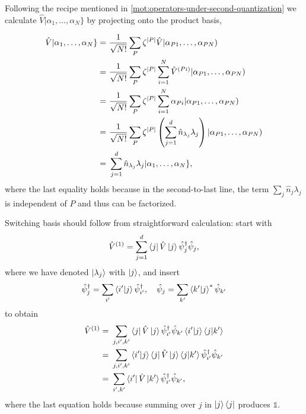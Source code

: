 \documentclass{article}
\theoremstyle{definition}
\numberwithin{equation}{section}
\begin{document}
Following the recipe mentioned 
in \cref{mot:operators-under-second-quantization}
we calculate $\hat{V}|\alpha_1, \ldots ,\alpha_{N}\}$ 
by projecting onto the product basis,

\begin{align*}
    \hat{V}|\alpha_1, \ldots ,\alpha_{N}\}
    =&\ 
    \frac{1}{\sqrt{N!}}
    \sum_{P}\zeta^{\abs{P}}
    \hat{V} |\alpha_{P1}, \ldots ,\alpha_{PN}) \\
    =&\ 
    \frac{1}{\sqrt{N!}}
    \sum_{P}\zeta^{\abs{P}}
    \sum_{i =1} ^{N}
    \hat{V}^{(Pi)}
    |\alpha_{P1}, \ldots ,\alpha_{PN}) \\
    =&\ 
    \frac{1}{\sqrt{N!}}
    \sum_{P}\zeta^{\abs{P}}
    \sum_{i = 1}^{N}
    \alpha_{Pi} |\alpha_{P1}, \ldots ,\alpha_{PN}) \\
    =&\ 
    \frac{1}{\sqrt{N!}}
    \sum_{P}\zeta^{\abs{P}}
    \left( 
        \sum_{j=1}^{d}
        \hat{n}_{\lambda_{j}}
        \lambda_{j}
    \right) 
    |\alpha_{P1}, \ldots ,\alpha_{PN}) \\
    =&\ 
    \sum_{j=1}^{d}
    \hat{n}_{\lambda_{j}}
    \lambda_{j}
    |\alpha_1, \ldots ,\alpha_{N}\},
\end{align*}
where the last equality holds 
because in the second-to-last line, 
the term $\sum_{j}\hat{n}_{j}\lambda_{j}$ 
is independent of $P$ and thus can be factorized. 

Switching basis should follow from straightforward 
calculation: start with 
\[
    \hat{V}^{(1)}
    =
    \sum_{j=1}^{d}
    \bra{j} \hat{V} \ket{j}
    \hat{\psi}^{\dagger}_{j}\hat{\psi}_{j},
\]
where we have denoted 
$\ket{\lambda_{j}}$ with $\ket{j}$, 
and insert 
\[
    \hat{\psi}^{\dagger}_{j}
    =
    \sum_{i'} \bra{i'} \ket{j}
    \hat{\psi}^{\dagger}_{i'}
    ,\quad
    \hat{\psi}_{j}
    =
    \sum_{k'} \bra{k'} \ket{j} ^{*}
    \hat{\psi}_{k'}
\]
to obtain
\begin{align*}
    \hat{V}^{(1)}=&\ 
    \sum_{j,i',k'}
    \bra{j}\hat{V} \ket{j}
    \hat{\psi}^{\dagger}_{i'}\hat{\psi}_{k'}
    \bra{i'} \ket{j} \bra{j} \ket{k'}
    \\
    =&\ 
    \sum_{j,i',k'}
    \bra{i'}\ket{j}\bra{j} \hat{V} \ket{j} \bra{j} \ket{k'}
    \hat{\psi}^{\dagger}_{i'}
    \hat{\psi}_{k'}
    \\
    =&\ 
    \sum_{i',k'}
    \bra{i'} \hat{V} \ket{k'}
    \hat{\psi}^{\dagger}_{i'} \hat{\psi}_{k'},
\end{align*}
where the last equation holds because 
summing over $j$ in $\ket{j} \bra{j}$ produces $\mathds{1}$.
\end{document}
